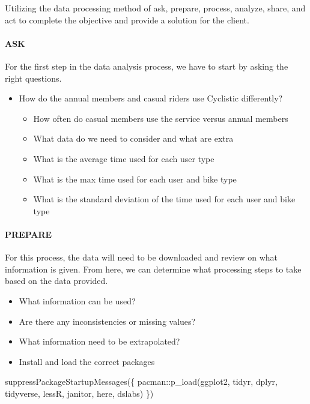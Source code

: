 \documentclass[
]{article}
\newenvironment{Shaded}{\begin{snugshade}}{\end{snugshade}}
\newcommand{\FunctionTok}[1]{\textcolor[rgb]{0.00,0.00,0.00}{#1}}
\newcommand{\NormalTok}[1]{#1}
\newcommand{\SpecialCharTok}[1]{\textcolor[rgb]{0.00,0.00,0.00}{#1}}
\providecommand{\tightlist}{%
  \setlength{\itemsep}{0pt}\setlength{\parskip}{0pt}}
\begin{document}
Utilizing the data processing method of ask, prepare, process, analyze,
share, and act to complete the objective and provide a solution for the
client.

\hypertarget{ask}{%
\paragraph{ASK}\label{ask}}

For the first step in the data analysis process, we have to start by
asking the right questions.

\begin{itemize}
\tightlist
\item
  How do the annual members and casual riders use Cyclistic differently?

  \begin{itemize}
  \tightlist
  \item
    How often do casual members use the service versus annual members
  \item
    What data do we need to consider and what are extra
  \item
    What is the average time used for each user type
  \item
    What is the max time used for each user and bike type
  \item
    What is the standard deviation of the time used for each user and
    bike type
  \end{itemize}
\end{itemize}

\hypertarget{prepare}{%
\paragraph{PREPARE}\label{prepare}}

For this process, the data will need to be downloaded and review on what
information is given. From here, we can determine what processing steps
to take based on the data provided.

\begin{itemize}
\tightlist
\item
  What information can be used?
\item
  Are there any inconsistencies or missing values?
\item
  What information need to be extrapolated?
\item
  Install and load the correct packages
\end{itemize}

\begin{Shaded}
\begin{Highlighting}[]
\FunctionTok{suppressPackageStartupMessages}\NormalTok{(\{}
\NormalTok{pacman}\SpecialCharTok{::}\FunctionTok{p\_load}\NormalTok{(ggplot2, tidyr, dplyr, tidyverse, lessR, janitor, here, dslabs)}
\NormalTok{\})}
\end{Highlighting}
\end{Shaded}
\end{document}

